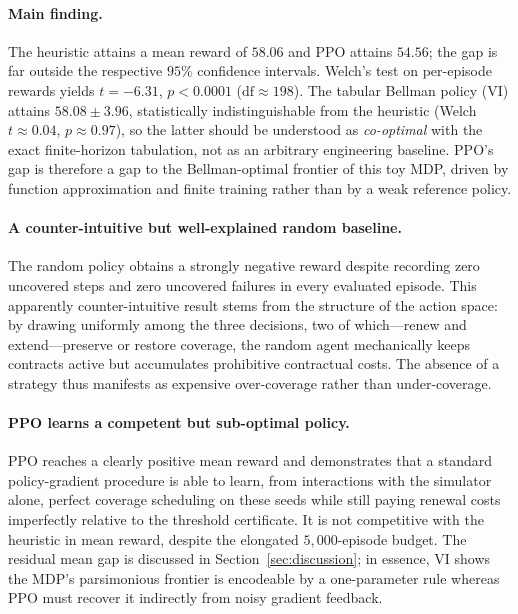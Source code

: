 \paragraph{Main finding.}
The heuristic attains a mean reward of $58.06$ and PPO attains $54.56$; the gap is far outside the respective $95\%$ confidence intervals. Welch's test on per-episode rewards yields $t = -6.31$, $p < 0.0001$ ($\mathrm{df} \approx 198$). The tabular Bellman policy (VI) attains $58.08 \pm 3.96$, statistically indistinguishable from the heuristic (Welch $t \approx 0.04$, $p \approx 0.97$), so the latter should be understood as \emph{co-optimal} with the exact finite-horizon tabulation, not as an arbitrary engineering baseline. PPO's gap is therefore a gap to the Bellman-optimal frontier of this toy MDP, driven by function approximation and finite training rather than by a weak reference policy.

\paragraph{A counter-intuitive but well-explained random baseline.}
The random policy obtains a strongly negative reward despite recording zero uncovered steps and zero uncovered failures in every evaluated episode. This apparently counter-intuitive result stems from the structure of the action space: by drawing uniformly among the three decisions, two of which---renew and extend---preserve or restore coverage, the random agent mechanically keeps contracts active but accumulates prohibitive contractual costs. The absence of a strategy thus manifests as expensive over-coverage rather than under-coverage.

\paragraph{PPO learns a competent but sub-optimal policy.}
PPO reaches a clearly positive mean reward and demonstrates that a standard policy-gradient procedure is able to learn, from interactions with the simulator alone, perfect coverage scheduling on these seeds while still paying renewal costs imperfectly relative to the threshold certificate. It is not competitive with the heuristic in mean reward, despite the elongated $5{,}000$-episode budget. The residual mean gap is discussed in Section~\ref{sec:discussion}; in essence, VI shows the MDP's parsimonious frontier is encodeable by a one-parameter rule whereas PPO must recover it indirectly from noisy gradient feedback.


